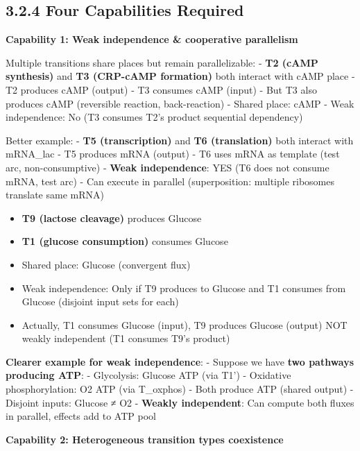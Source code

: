\hypertarget{four-capabilities-required}{%
\subsection{3.2.4 Four Capabilities
Required}\label{four-capabilities-required}}

\textbf{Capability 1: Weak independence \& cooperative parallelism}

Multiple transitions share places but remain parallelizable: -
\textbf{T2 (cAMP synthesis)} and \textbf{T3 (CRP-cAMP formation)} both
interact with cAMP place - T2 produces cAMP (output) - T3 consumes cAMP
(input) - But T3 also produces cAMP (reversible reaction, back-reaction)
- Shared place: cAMP - Weak independence: No (T3 consumes T2's product \textrightarrow
sequential dependency)

Better example: - \textbf{T5 (transcription)} and \textbf{T6
(translation)} both interact with mRNA\_lac - T5 produces mRNA (output)
- T6 uses mRNA as template (test arc, non-consumptive) - \textbf{Weak
independence}: YES (T6 does not consume mRNA, test arc) - Can execute in
parallel (superposition: multiple ribosomes translate same mRNA)

\begin{itemize}
\tightlist
\item
  \textbf{T9 (lactose cleavage)} produces Glucose
\item
  \textbf{T1 (glucose consumption)} consumes Glucose
\item
  Shared place: Glucose (convergent flux)
\item
  Weak independence: Only if T9 produces to Glucose and T1 consumes from
  Glucose (disjoint input sets for each)
\item
  Actually, T1 consumes Glucose (input), T9 produces Glucose (output) \textrightarrow
  NOT weakly independent (T1 consumes T9's product)
\end{itemize}

\textbf{Clearer example for weak independence}: - Suppose we have
\textbf{two pathways producing ATP}: - Glycolysis: Glucose \textrightarrow ATP (via
T1') - Oxidative phosphorylation: O2 \textrightarrow ATP (via T\_oxphos) - Both
produce ATP (shared output) - Disjoint inputs: Glucose ≠ O2 -
\textbf{Weakly independent}: Can compute both fluxes in parallel,
effects add to ATP pool

\textbf{Capability 2: Heterogeneous transition types coexistence}

